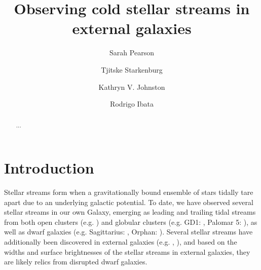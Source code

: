 \documentclass[twocolumn]{aastex62}
\begin{document}
\sloppy\sloppypar\raggedbottom\frenchspacing %
\title{Observing cold stellar streams in external galaxies}


 \author{Sarah Pearson}

\author{Tjitske Starkenburg}

\author{Kathryn V. Johnston}

\author{Rodrigo Ibata}

\begin{abstract}\noindent %
    ...
\end{abstract}

\section{Introduction} \label{sec:intro}
Stellar streams form when a gravitationally bound ensemble of stars tidally tare apart due to an underlying galactic potential. To date, we have observed several stellar streams in our own Galaxy, emerging as leading and trailing tidal streams from both open clusters (e.g. \citealt{roser19}) and globular clusters (e.g. GD1: \citealt{grillmair06}, Palomar 5: \citealt{oden01}), as well as dwarf galaxies (e.g. Sagittarius: \citealt{ibata01}, Orphan: \citealt{belokurov06}). Several stellar streams have additionally been discovered in external galaxies (e.g. \citealt{ibata00}, \citealt{delgado10}), and based on the widths and surface brightnesses of the stellar streams in external galaxies, they are likely relics from disrupted dwarf galaxies.
\end{document}

